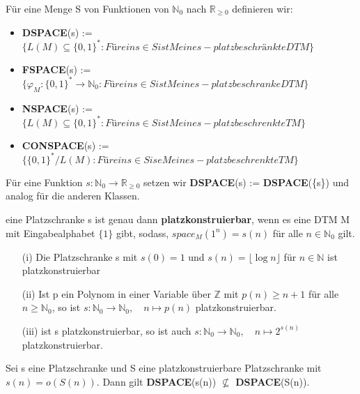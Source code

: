     Für eine Menge S von Funktionen von \(\mathbb{N}_0\) nach \(\mathbb{R}_{\geq 0}\) definieren wir:
    \begin{itemize}
        \item \textbf{DSPACE}(s) := \(\{L(M) \subseteq \{0, 1\}^* : Für ein s \in S ist M eine s-platzbeschränkte DTM\}\)
        \item \textbf{FSPACE}(s) := \(\{\varphi_M : \{0, 1\}^* \to \mathbb{N}_0 : Für ein s \in S ist M eine s-platzbeschranke DTM\}\)
        \item \textbf{NSPACE}(s) := \(\{L(M) \subseteq \{0, 1\}^* : Für ein s \in S ist M eine s-platzbeschrenkte TM\}\)
        \item \textbf{CONSPACE}(s) := \(\{\{0, 1\}^* / L(M) : Für ein s \in S ise M eine s-platzbeschrenkte TM\}\)
    \end{itemize}
    Für eine Funktion \(s : \mathbb{N}_0 \to \mathbb{R}_{\geq 0}\) setzen wir \textbf{DSPACE}(s) := \textbf{DSPACE}(\{s\}) und analog für die anderen Klassen.

    eine Platzschranke s ist genau dann \textbf{platzkonstruierbar}, wenn es eine DTM M mit Eingabealphabet \(\{1\}\) gibt, sodass, \(space_M(1^n) = s(n)\) für alle \(n \in \mathbb{N}_0\) gilt.

    \begin{itemize}
        \item [(i)] Die Platzschranke s mit \(s(0) = 1\) und \(s(n) = \lfloor \log n\rfloor \) für \(n \in \mathbb{N}\) ist platzkonstruierbar 
        \item [(ii)] Ist p ein Polynom in einer Variable über \(\mathbb{Z}\) mit \(p(n) \geq n +1\) für alle \(n \geq \mathbb{N}_0\), so ist \(s : \mathbb{N}_0 \to \mathbb{N}_0, \quad n \mapsto p(n)\) platzkonstruierbar.
        \item [(iii)] ist s platzkonstruierbar, so ist auch \(s: \mathbb{N}_0 \to \mathbb{N}_0, \quad n \mapsto 2^{s(n)}\) platzkonstruierbar.
    \end{itemize}

    Sei s eine Platzschranke und S eine platzkonstruierbare Platzschranke mit \(s(n) = o(S(n))\). Dann gilt \textbf{DSPACE}(s(n)) \(\not \subseteq\) \textbf{DSPACE}(S(n)).